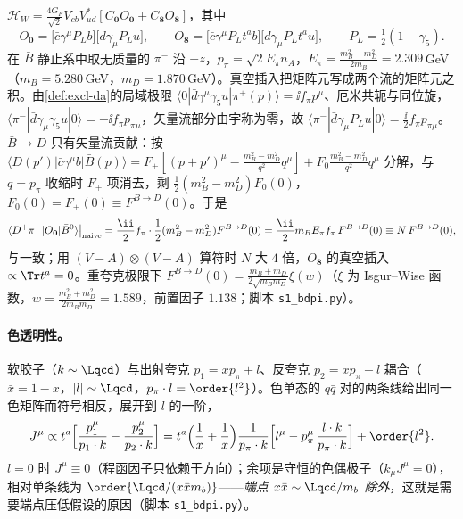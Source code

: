 \begin{example}[朴素因子化与归一化 $N$]\label{ex:heavy-naive}
$\mathcal H_W=\frac{4G_F}{\sqrt2}V_{cb}V_{ud}^*[C_{\mathbf 0}O_{\mathbf 0}+C_{\mathbf 8}O_{\mathbf 8}]$，其中\cite[式~(2)]{BauerPirjolStewart2001}
\begin{equation}\label{eq:heavy-O08}
O_{\mathbf 0}=\big[\bar c\gamma^\mu P_Lb\big]\big[\bar d\gamma_\mu P_Lu\big],\qquad
O_{\mathbf 8}=\big[\bar c\gamma^\mu P_Lt^ab\big]\big[\bar d\gamma_\mu P_Lt^au\big],\qquad P_L=\tfrac12(1-\gamma_5).
\end{equation}
在 $\bar B$ 静止系中取无质量的 $\pi^-$ 沿 $+z$，$p_\pi=\sqrt2E_\pi n_A$，$E_\pi=\frac{m_B^2-m_D^2}{2m_B}=2.309$\,GeV（$m_B=5.280$\,GeV，$m_D=1.870$\,GeV\cite{ParticleDataGroup:2024cfk}）。真空插入把矩阵元写成两个流的矩阵元之积。由\cref{def:excl-da}的局域极限 $\langle0|\bar d\gamma^\mu\gamma_5u|\pi^+(p)\rangle=\ii f_\pi p^\mu$、厄米共轭与同位旋，$\langle\pi^-|\bar d\gamma_\mu\gamma_5u|0\rangle=-\ii f_\pi p_{\pi\mu}$，矢量流部分由宇称为零，故 $\langle\pi^-|\bar d\gamma_\mu P_Lu|0\rangle=\frac{\ii}{2}f_\pi p_{\pi\mu}$。$\bar B\to D$ 只有矢量流贡献：按 $\langle D(p')|\bar c\gamma^\mu b|\bar B(p)\rangle=F_+[(p+p')^\mu-\frac{m_B^2-m_D^2}{q^2}q^\mu]+F_0\frac{m_B^2-m_D^2}{q^2}q^\mu$ 分解，与 $q=p_\pi$ 收缩时 $F_+$ 项消去，剩 $\frac12(m_B^2-m_D^2)F_0(0)$，$F_0(0)=F_+(0)\equiv F^{B\to D}(0)$。于是
\begin{equation}\label{eq:heavy-naive}
\langle D^+\pi^-|O_{\mathbf 0}|\bar B^0\rangle\big|_{\rm naive}=\frac{\ii}{2}f_\pi\cdot\frac12(m_B^2-m_D^2)F^{B\to D}(0)=\frac{\ii}{2}m_BE_\pi f_\pi\,F^{B\to D}(0)\equiv N\,F^{B\to D}(0),
\end{equation}
与\cite[式~(8)]{BauerPirjolStewart2001}一致；用 $(V-A)\otimes(V-A)$ 算符时 $N$ 大 $4$ 倍，$O_{\mathbf 8}$ 的真空插入 $\propto\Tr t^a=0$。重夸克极限下 $F^{B\to D}(0)=\frac{m_B+m_D}{2\sqrt{m_Bm_D}}\xi(w)$（$\xi$ 为 Isgur--Wise 函数，$w=\frac{m_B^2+m_D^2}{2m_Bm_D}=1.589$，前置因子 $1.138$；脚本 \texttt{s1\_\allowbreak bdpi.py}）。
\end{example}

\paragraph{色透明性。}
软胶子（$k\sim\Lqcd$）与出射夸克 $p_1=xp_\pi+l$、反夸克 $p_2=\bar xp_\pi-l$ 耦合（$\bar x=1-x$，$|l|\sim\Lqcd$，$p_\pi\cdot l=\order{l^2}$）。色单态的 $q\bar q$ 对的两条线给出同一色矩阵而符号相反，展开到 $l$ 的一阶，
\begin{equation}\label{eq:heavy-dipole}
J^\mu\propto t^a\Big[\frac{p_1^\mu}{p_1\cdot k}-\frac{p_2^\mu}{p_2\cdot k}\Big]
=t^a\Big(\frac1x+\frac1{\bar x}\Big)\frac{1}{p_\pi\cdot k}\Big[l^\mu-p_\pi^\mu\,\frac{l\cdot k}{p_\pi\cdot k}\Big]+\order{l^2}.
\end{equation}
$l=0$ 时 $J^\mu\equiv0$（程函因子只依赖于方向）；余项是守恒的色偶极子（$k_\mu J^\mu=0$），相对单条线为 $\order{\Lqcd/(x\bar xm_b)}$——\emph{端点 $x\bar x\sim\Lqcd/m_b$ 除外}，这就是需要端点压低假设的原因（脚本 \texttt{s1\_\allowbreak bdpi.py}）。

